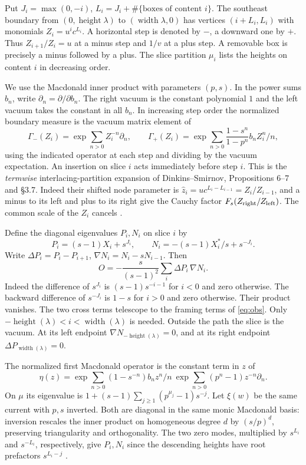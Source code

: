 Put \(J_i=\max(0,-i)\), \(L_i=J_i+\#\{\text{boxes of content }i\}\). The southeast boundary from \((0,\operatorname{height}\lambda)\) to \((\operatorname{width}\lambda,0)\) has vertices \((i+L_i,L_i)\) with monomials \(Z_i=u^i c^{L_i}\). A horizontal step is denoted by \(-\), a downward one by \(+\). Thus \(Z_{i+1}/Z_i=u\) at a minus step and \(1/v\) at a plus step. A removable box is precisely a minus followed by a plus. The slice partition \(\mu_i\) lists the heights on content \(i\) in decreasing order.

We use the Macdonald inner product with parameters \((p,s)\). In the power sums \(b_n\), write \(\partial_n=\partial/\partial b_n\). The right vacuum is the constant polynomial $1$ and the left vacuum takes the constant in all $b_n$. In increasing step order the normalized boundary measure is the vacuum matrix element of
\[
 \Gamma_-(Z_i)=\exp\!\sum_{n>0} Z_i^{-n}\partial_n,\qquad
 \Gamma_+(Z_i)=\exp\!\sum_{n>0}\frac{1-s^n}{1-p^n} b_n Z_i^n/n ,
\]
using the indicated operator at each step and dividing by the vacuum expectation. An insertion on slice \(i\) acts immediately before step \(i\). This is the \emph{termwise} interlacing-partition expansion of Dinkins--Smirnov, Propositions 6--7 and \S{}3.7. Indeed their shifted node parameter is \(\widehat z_i=u c^{L_i-L_{i-1}}=Z_i/Z_{i-1}\), and a minus to its left and plus to its right give the Cauchy factor \(F_s(Z_{\rm right}/Z_{\rm left})\). The common scale of the \(Z_i\) cancels \cite[\S3]{DS}.

Define the diagonal eigenvalues \(P_i,N_i\) on slice \(i\) by
\[
 P_i=(s-1)X_i+s^{J_i},\qquad N_i=-(s-1)X_i^*/s+s^{-J_i}.
\]
Write \(\Delta P_i=P_i-P_{i+1}\), \(\nabla N_i=N_i-sN_{i-1}\). Then
\begin{equation}
O=-\frac{s}{(s-1)^2}\sum_i \Delta P_i\,\nabla N_i .
 \label{eq:diff}
\end{equation}
Indeed the difference of \(s^{J_i}\) is \((s-1)s^{-i-1}\) for \(i<0\) and zero otherwise. The backward difference of \(s^{-J_i}\) is \(1-s\) for \(i>0\) and zero otherwise. Their product vanishes. The two cross terms telescope to the framing terms of \eqref{eq:obs}. Only $-\operatorname{height}(\lambda)<i<\operatorname{width}(\lambda)$ is needed. Outside the path the slice is the vacuum. At its left endpoint $\nabla N_{-\operatorname{height}(\lambda)}=0$, and at its right endpoint $\Delta P_{\operatorname{width}(\lambda)}=0$.

The normalized first Macdonald operator is the constant term in \(z\) of
\[
 \eta(z)=\exp\!\sum_{n>0}(1-s^{-n})b_n z^n/n\
          \exp\!\sum_{n>0}(p^n-1)z^{-n}\partial_n.
\]
On \(\mu\) its eigenvalue is \(1+(s-1)\sum_{j\ge1}(p^{\mu_j}-1)s^{-j}\). Let \(\xi(w)\) be the same current with \(p,s\) inverted. Both are diagonal in the same monic Macdonald basis: inversion rescales the inner product on homogeneous degree \(d\) by \((s/p)^d\), preserving triangularity and orthogonality. The two zero modes, multiplied by \(s^{L_i}\) and \(s^{-L_i}\), respectively, give \(P_i,N_i\) since the descending heights have root prefactors \(s^{L_i-j}\) \cite[Proposition~2.6]{Ko}.

